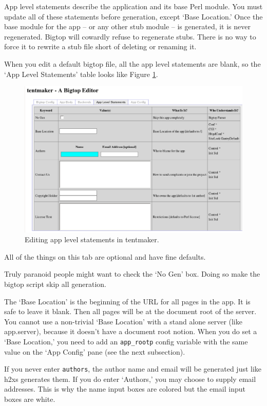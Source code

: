 App level statements describe the application and its base Perl module.
You must update all of these statements before generation, except `Base
Location.'  Once the base module for the app -- or any other stub module -- is
generated, it is never regenerated.  Bigtop will cowardly refuse to
regenerate stubs.  There is no way to force it to rewrite a stub file short
of deleting or renaming it.

When you edit a default bigtop file, all the app level statements are
blank, so the `App Level Statements' table looks like Figure
\ref{fig:appstat}.

\begin{figure}
\includegraphics[width=6in]{appstat}
\caption{Editing app level statements in tentmaker.}
\label{fig:appstat}
\end{figure}

All of the things on this tab are optional and have fine defaults.

Truly paranoid people might want to check the `No Gen' box.  Doing
so make the bigtop script skip all generation.

The `Base Location' is the beginning of the URL for all pages in the app.
It is safe to leave it blank.  Then all pages will be at the document
root of the server.  You cannot use a non-trivial `Base Location' with
a stand alone server (like app.server), because it doesn't have a document
root notion.  When you do set a `Base Location,' you need to add an
\verb+app_rootp+ config variable with the same value on the `App Config'
pane (see the next subsection).

If you never enter \verb+authors+, the author name and email will be generated
just like h2xs generates them.  If you do enter `Authors,' you may choose
to supply email addresses.  This is why the name input boxes are colored but
the email input boxes are white.

